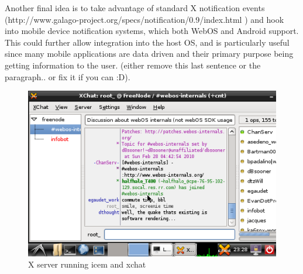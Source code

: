 Another final idea is to take advantage of standard X notification events \cite{notifications} (http://www.galago-project.org/specs/notification/0.9/index.html ) and hook into mobile device notification systems, which both WebOS and Android support.  This could further allow integration into the host OS, and is particularly useful since many mobile applications are data driven and their primary purpose being getting information to the user. (either remove this last sentence or the paragraph.. or fix it if you can :D).

\begin{figure}[tbh]
\centering
\includegraphics[width=1.0\columnwidth]{xchat1}
\caption{X server running icem and xchat}
\label{fig:x_screenie}
\end{figure}
